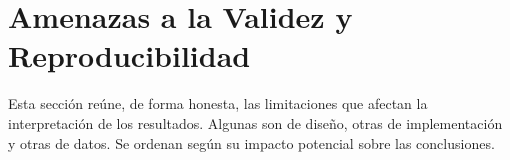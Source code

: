 

\section{Amenazas a la Validez y Reproducibilidad}

Esta sección reúne, de forma honesta, las limitaciones que afectan la interpretación de los resultados. Algunas son de diseño, otras de implementación y otras de datos. Se ordenan según su impacto potencial sobre las conclusiones.

